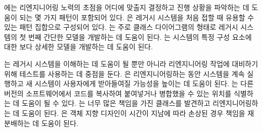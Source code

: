 \documentclass[a4paper,10pt,twoside]{book}
\begin{document}
에는 리엔지니어링 노력의 초점을 어디에 맞출지 결정하고 진행 상황을 파악하는 데 도움이 되는 몇 가지 패턴이 포함되어 있다. 은 레거시 시스템을 처음 접할 때 유용할 수 있는 패턴 집합으로 구성되어 있다. 는 주로 클래스 다이어그램의 형태로 레거시 시스템의 첫 번째 간단한 모델을 개발하는 데 도움이 된다. 는 시스템의 특정 구성 요소에 대한 보다 상세한 모델을 개발하는 데 도움이 된다.

는 레거시 시스템을 이해하는 데 도움이 될 뿐만 아니라 리엔지니어링 작업에 대비하기 위해 테스트를 사용하는 데 중점을 둔다. 은 리엔지니어링하는 동안 시스템을 계속 실행하고 새 시스템이 사용자에게 받아들여질 가능성을 높이는 데 도움이 된다. 는 다른 버전의 소프트웨어에서 코드를 복사하여 붙여넣거나 병합했을 수 있는 위치를 식별하는 데 도움이 될 수 있다. 는 너무 많은 책임을 가진 클래스를 발견하고 리엔지니어링하는 데 도움이 된다. 은 객체 지향 디자인이 시간이 지남에 따라 손상된 경우 책임을 재분배하는 데 도움이 된다.

\ifx\wholebook\relax\else
   
   
   
\end{document}
